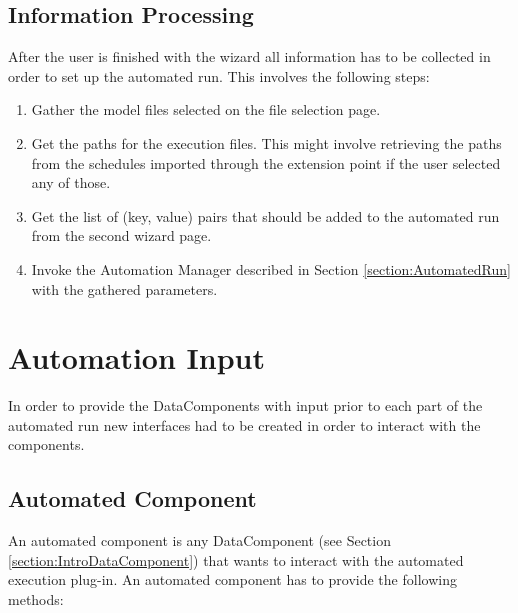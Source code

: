 \subsection{Information Processing}
\label{section:InformationProcessing}
After the user is finished with the wizard all information has to be collected in order to set up the automated run.
This involves the following steps:
\begin{enumerate}
 \item Gather the model files selected on the file selection page.
 \item Get the paths for the execution files. This might involve retrieving the paths from the schedules imported through
the extension point if the user selected any of those.
 \item Get the list of (key, value) pairs that should be added to the automated run from the second wizard page.
 \item Invoke the Automation Manager described in Section \ref{section:AutomatedRun} with the gathered parameters.
\end{enumerate}


\section{Automation Input}
\label{section:AutoInput}
In order to provide the DataComponents with input prior to each part of the automated run new interfaces
had to be created in order to interact with the components. 

\subsection{Automated Component}
An automated component is any DataComponent (see Section \ref{section:IntroDataComponent}) that wants to interact with
the automated execution plug-in. An automated component has to provide the following methods:

